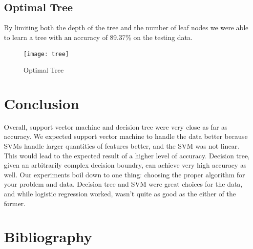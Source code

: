 \documentclass{article} %
\begin{document}
\subsection{Optimal Tree}
By limiting both the depth of the tree and the number of leaf nodes we were able to learn a tree with an accuracy of 89.37\% on the testing data.
\begin{figure}[H]
\texttt{[image: tree]}
\caption{Optimal Tree}
\end{figure}

\section{Conclusion}
Overall, support vector machine and decision tree were very close as far as accuracy.
We expected support vector machine to handle the data better because SVMs handle
larger quantities of features better, and the SVM was not linear. This would lead
to the expected result of a higher level of accuracy. Decision tree, given an
arbitrarily complex decision boundry, can achieve very high accuracy as well. Our
experiments boil down to one thing: choosing the proper algorithm for your
problem and data. Decision tree and SVM were great choices for the data, and while
logistic regression worked, wasn't quite as good as the either of the former.

\clearpage

\section{Bibliography}


\end{document}
